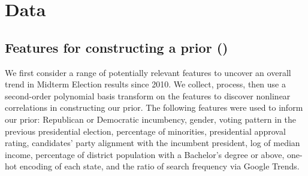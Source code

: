 \documentclass[12pt, letterpaper]{article}
\begin{document}


\section{Data}
\label{sec:data}
\subsection{Features for constructing a prior ()}
We first consider a range of potentially relevant features to uncover an overall trend in Midterm Election results since 2010. We collect, process, then use a second-order polynomial basis transform on the features to discover nonlinear correlations in constructing our prior. The following features were used to inform our prior: Republican or Democratic incumbency, gender, voting pattern in the previous presidential election, percentage of minorities, presidential approval rating, candidates’ party alignment with the incumbent president, log of median income, percentage of district population with a Bachelor’s degree or above, one-hot encoding of each state, and the ratio of search frequency via Google Trends.
\end{document}
